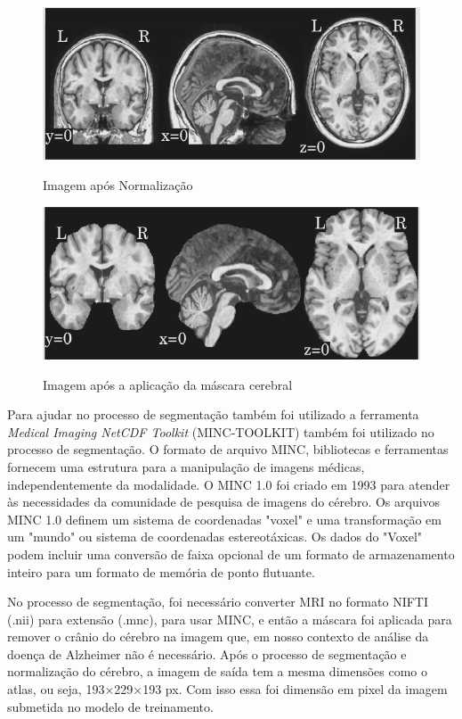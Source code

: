 \documentclass[openright]{UFRGS} %
\begin{document}
\begin{figure}[h]
    \centering
    \caption{Imagem após Normalização}
    \includegraphics[scale=0.40]{MRIG3t1Normalization.png}
    \label{fig:MRIG3t1Normalization}
\end{figure}


\begin{figure}[h]
    \centering
    \caption{Imagem após a aplicação da máscara cerebral}
    \includegraphics[scale=0.40]{MRIG3t1final.png}
    \label{fig:MRIG3t1final}
\end{figure}

Para ajudar no processo de segmentação também foi utilizado a ferramenta \textit{Medical Imaging NetCDF Toolkit} (MINC-TOOLKIT) também foi utilizado no processo de segmentação. O formato de arquivo MINC, bibliotecas e ferramentas fornecem uma estrutura para a manipulação de imagens médicas, independentemente da modalidade. O MINC 1.0 foi criado em 1993 para atender às necessidades da comunidade de pesquisa de imagens do cérebro. 
Os arquivos MINC 1.0 definem um sistema de coordenadas "voxel" 
e uma transformação em um "mundo" ou sistema de coordenadas estereotáxicas.
Os dados do "Voxel" podem incluir uma conversão de faixa opcional de um formato de
armazenamento inteiro para um formato de memória de ponto flutuante.

No processo de segmentação, foi necessário converter MRI no formato NIFTI (.nii) para extensão (.mnc), para usar MINC,
e então a máscara foi aplicada para remover o crânio do cérebro na 
imagem que, em nosso contexto de análise da doença de Alzheimer não é necessário. Após o processo de segmentação e normalização do cérebro, a imagem de saída tem a mesma dimensões como o atlas, ou seja, 193×229×193 px.
Com isso essa foi dimensão em pixel da imagem submetida no modelo de treinamento.
\end{document}
